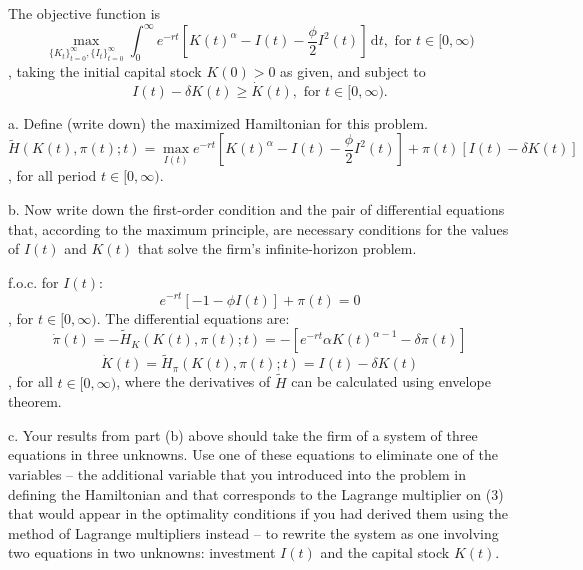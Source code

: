 \documentclass[12pt]{article}
\begin{document}
The objective function is $$
\max_{\{K_t\}^\infty_{t=0}, \{I_t\}^\infty_{t=0}} \int_{0}^{\infty} e^{-rt} [K(t)^{\alpha} - I(t) - \frac{\phi}{2}I^{2}(t)] \, \mathrm{d}t, \text{ for  } t \in [0,\infty)
$$, taking the initial capital stock $K(0)>0$ as given, and subject to $$
I(t)-\delta K(t) \geq \dot{K}(t), \text{ for } t \in [0,\infty). 
$$
\begin{description}
\item a. Define (write down) the maximized Hamiltonian for this problem. 
\begin{equation}
    \tilde{H}(K(t), \pi(t); t) = \max_{I(t)} e^{-rt}[K(t)^\alpha - I(t) - \frac{\phi}{2}I^{2}(t)] + \pi(t)[I(t) - \delta K(t)]
\end{equation}, for all period $t \in [0, \infty)$. 
\item b. Now write down the first-order condition and the pair of differential equations that, according to the maximum principle, are necessary conditions for the values of $I(t)$ and $K(t)$ that solve the firm's infinite-horizon problem.

f.o.c. for $I(t)$: 
\begin{equation}
    e^{-rt}[-1 - \phi I(t)] + \pi(t) = 0
\end{equation}, for $t \in [0, \infty)$. The differential equations are: 
\begin{equation}
    \dot{\pi}(t) = -\tilde{H}_K(K(t), \pi(t); t) = -[e^{-rt} \alpha K(t)^{\alpha - 1} - \delta
    \pi(t)]
\end{equation}
\begin{equation}
    \dot{K}(t) = \tilde{H}_\pi(K(t), \pi(t); t) = I(t) - \delta K(t) 
\end{equation}, for all $t \in [0, \infty)$, where the derivatives of $\tilde{H}$ can be calculated using envelope theorem. 
\item c. Your results from part (b) above should take the firm of a system of three equations in three unknowns. Use one of these equations to eliminate one of the variables -- the additional variable that you introduced into the problem in defining the Hamiltonian and that corresponds to the Lagrange multiplier on (3) that would appear in the optimality conditions if you had derived them using the method of Lagrange multipliers instead -- to rewrite the system as one involving two equations in two unknowns: investment $I(t)$ and the capital stock $K(t)$.


\end{description}
\end{document}
